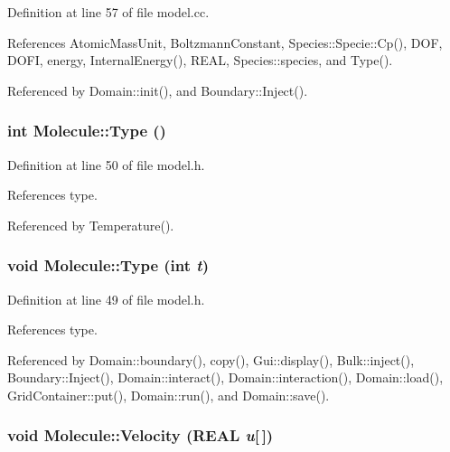 Definition at line 57 of file model.cc.

References AtomicMassUnit, BoltzmannConstant, Species::Specie::Cp(), DOF, DOFI, energy, InternalEnergy(), REAL, Species::species, and Type().

Referenced by Domain::init(), and Boundary::Inject().\hypertarget{classMolecule_cfda1c0c7b2f35dacc50e9859aad82c6}{
\subsubsection[{Type}]{\setlength{\rightskip}{0pt plus 5cm}int Molecule::Type ()}}
\label{classMolecule_cfda1c0c7b2f35dacc50e9859aad82c6}




Definition at line 50 of file model.h.

References type.

Referenced by Temperature().\hypertarget{classMolecule_cc9589d399845b82ad02886a7075fe06}{
\subsubsection[{Type}]{\setlength{\rightskip}{0pt plus 5cm}void Molecule::Type (int {\em t})}}
\label{classMolecule_cc9589d399845b82ad02886a7075fe06}




Definition at line 49 of file model.h.

References type.

Referenced by Domain::boundary(), copy(), Gui::display(), Bulk::inject(), Boundary::Inject(), Domain::interact(), Domain::interaction(), Domain::load(), GridContainer::put(), Domain::run(), and Domain::save().\hypertarget{classMolecule_57214f734d0091fd3ece17dcd822ea24}{
\subsubsection[{Velocity}]{\setlength{\rightskip}{0pt plus 5cm}void Molecule::Velocity (REAL {\em u}\mbox{[}$\,$\mbox{]})}}
\label{classMolecule_57214f734d0091fd3ece17dcd822ea24}




